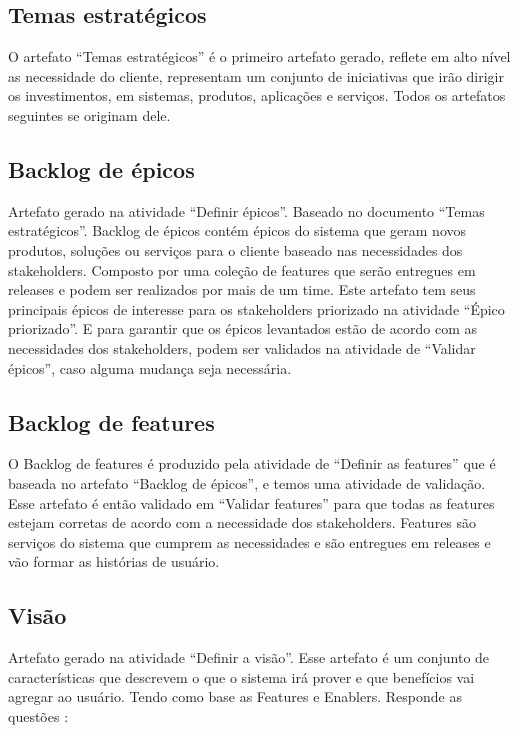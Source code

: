 \subsection {Temas estratégicos}

  O artefato “Temas estratégicos” é o primeiro artefato gerado, reflete em alto nível as necessidade do cliente, representam  um conjunto de iniciativas que irão dirigir os investimentos, em sistemas, produtos, aplicações e serviços. Todos os artefatos seguintes se originam dele.
  
\subsection {Backlog de épicos}
  
  Artefato gerado na atividade “Definir épicos”. Baseado no documento “Temas estratégicos”. Backlog de épicos contém épicos do sistema que geram novos produtos, soluções ou serviços para o cliente baseado nas necessidades dos stakeholders. Composto por uma coleção de features que serão entregues em releases e podem ser realizados por mais de um time.
  Este artefato tem seus principais épicos de interesse para os stakeholders priorizado na atividade “Épico priorizado”. E para garantir que os épicos levantados estão de acordo com as necessidades dos stakeholders, podem ser validados na atividade de “Validar épicos”, caso alguma mudança seja necessária.

\subsection {Backlog de features}

  O Backlog de features é produzido pela atividade de “Definir as features” que é baseada no artefato “Backlog de épicos”, e temos uma atividade de validação. Esse artefato é então validado em “Validar features” para que todas as features estejam corretas de acordo com a necessidade dos stakeholders. Features são serviços do sistema que cumprem as necessidades e são entregues em releases e vão formar as histórias de usuário.

\subsection {Visão}

  Artefato gerado na atividade “Definir a visão”. Esse artefato é um conjunto de características que descrevem o que o sistema irá prover e que benefícios vai agregar ao usuário. Tendo como base as Features e Enablers.
  Responde as  questões :

